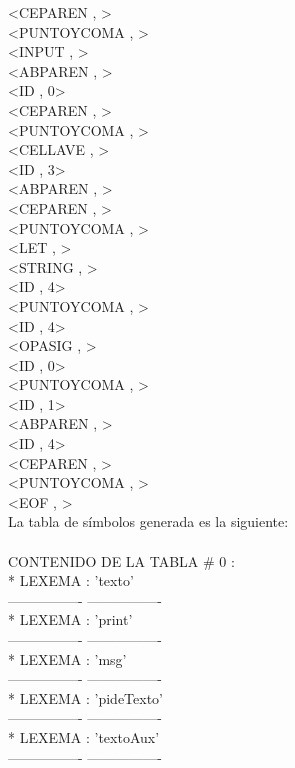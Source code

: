 \documentclass{article}
\begin{document}
\begin{flushleft}
<CEPAREN , >\\
<PUNTOYCOMA , >\\
<INPUT , >\\
<ABPAREN , >\\
<ID , 0>\\
<CEPAREN , >\\
<PUNTOYCOMA , >\\
<CELLAVE , >\\
<ID , 3>\\
<ABPAREN , >\\
<CEPAREN , >\\
<PUNTOYCOMA , >\\
<LET , >\\
<STRING , >\\
<ID , 4>\\
<PUNTOYCOMA , >\\
<ID , 4>\\
<OPASIG , >\\
<ID , 0>\\
<PUNTOYCOMA , >\\
<ID , 1>\\
<ABPAREN , >\\
<ID , 4>\\
<CEPAREN , >\\
<PUNTOYCOMA , >\\
<EOF , >\\
La tabla de símbolos generada es la siguiente:\\
\quad\\
CONTENIDO DE LA TABLA \# 0 :\\

*	LEXEMA : 'texto'\\
---------------- ----------------\\
*	LEXEMA : 'print'\\
---------------- ----------------\\
*	LEXEMA : 'msg'\\
---------------- ----------------\\
*	LEXEMA : 'pideTexto'\\
---------------- ----------------\\
*	LEXEMA : 'textoAux'\\
---------------- ----------------\\
\end{flushleft}
\clearpage
\end{document}
